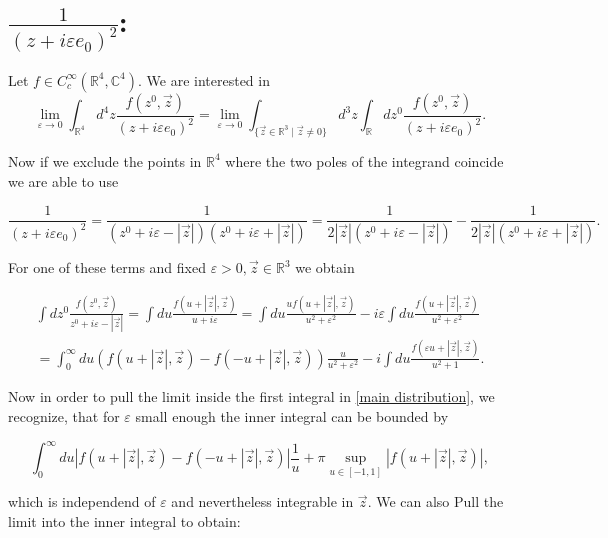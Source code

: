 \documentclass[a4paper,11pt]{article}
\begin{document}
\section{\(\frac{1}{(z+i\varepsilon e_0)^2}\):}

Let \(f\in C_c^\infty(\mathbb{R}^4,\mathbb{C}^4)\). We are interested in
\begin{equation}\label{main distribution}
\lim_{\varepsilon \rightarrow 0} \int_{\mathbb{R}^4} d^4z \frac{f(z^0,\vec{z})}{(z+i \varepsilon e_0)^2}
=\lim_{\varepsilon \rightarrow 0}\int_{\{\vec{z}\in\mathbb{R}^3\mid \vec{z}\neq 0\}}d^3 z \int_{\mathbb{R}} dz^0 \frac{f(z^0,\vec{z})}{(z+i \varepsilon e_0)^2}.
\end{equation}

Now if we exclude the points in \(\mathbb{R}^4\) where the two poles of the integrand coincide we are able to use

\begin{equation}
\frac{1}{(z+i \varepsilon e_0)^2}=\frac{1}{(z^0 + i \varepsilon -|\vec{z}|)(z^0 + i \varepsilon +|\vec{z}|)}
=\frac{1}{2 |\vec{z}| (z^0+ i \varepsilon - |\vec{z}|)} - \frac{1}{2 |\vec{z}| (z^0+ i \varepsilon + |\vec{z}|)}.
\end{equation}

For one of these terms and fixed \(\varepsilon>0, \vec{z}\in\mathbb{R}^3\) we obtain

\begin{align}
\int d z^0 \frac{f(z^0,\vec{z})}{z^0+i \varepsilon -|\vec{z}|}=
\int d u \frac{f(u+|\vec{z}|,\vec{z})}{u+i \varepsilon}= 
\int d u \frac{u f(u+|\vec{z}|,\vec{z})}{u^2+\varepsilon^2} - i \varepsilon \int du \frac{f(u+|\vec{z}|,\vec{z})}{u^2+\varepsilon^2}\\
=\int_0^\infty du \left(f(u + |\vec{z}|,\vec{z})-f(-u + |\vec{z}|,\vec{z})\right)\frac{u}{u^2+\varepsilon^2} 
- i \int d u \frac{f(\varepsilon u + |\vec{z}|,\vec{z})}{u^2+1}.
\end{align}

Now in order to pull the limit inside the first integral in \eqref{main distribution}, we recognize, that for \(\varepsilon\) small enough
 the inner integral can be bounded by 

\begin{equation}\label{upper bound}
\int_0^\infty du \left|f(u + |\vec{z}|,\vec{z})-f(-u + |\vec{z}|,\vec{z})\right|\frac{1}{u} 
+  \pi \sup_{u\in [-1,1]}|f(u + |\vec{z}|,\vec{z})|,
\end{equation}

which is independend of \(\varepsilon\) and nevertheless integrable in \(\vec{z}\).
We can also Pull the limit into the inner integral to obtain:
\end{document}
